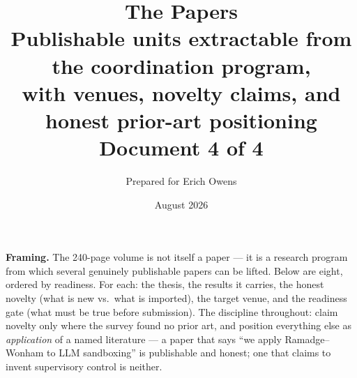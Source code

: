 \documentclass[11pt,a4paper]{article}
\title{\textbf{The Papers}\\[4pt]
\large Publishable units extractable from the coordination program,\\ with venues, novelty claims, and honest prior-art positioning\\[3pt]
\normalsize Document 4 of 4}
\author{Prepared for Erich Owens}
\date{August 2026}
\begin{document}
\maketitle

\noindent\textbf{Framing.} The 240-page volume is not itself a paper --- it is a research program from which several genuinely publishable papers can be lifted. Below are eight, ordered by readiness. For each: the thesis, the results it carries, the honest novelty (what is new vs.\ what is imported), the target venue, and the readiness gate (what must be true before submission). The discipline throughout: claim novelty only where the survey found no prior art, and position everything else as \emph{application} of a named literature --- a paper that says ``we apply Ramadge--Wonham to LLM sandboxing'' is publishable and honest; one that claims to invent supervisory control is neither.
\end{document}
